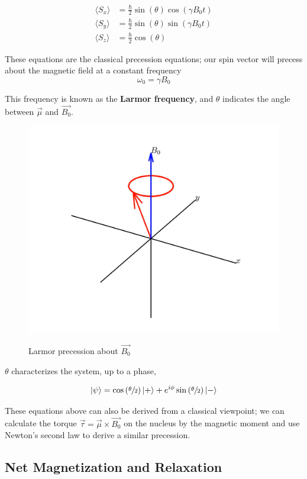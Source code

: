 \documentclass[
    floatfix,  %
    reprint,
    amsmath,amssymb,
    aps,
]{revtex4-2}
\DeclarePairedDelimiter\ket{\lvert}{\rangle}
\begin{document}
\begin{align*}
    \langle S_x \rangle &= \frac{\hbar}{2} \sin(\theta)\cos(\gamma B_0 t)\\
    \langle S_y \rangle &= \frac{\hbar}{2} \sin(\theta)\sin(\gamma B_0 t)\\
    \langle S_z \rangle &= \frac{\hbar}{2} \cos(\theta)
\end{align*}

These equations are the classical precession equations; our spin vector will precess about the magnetic field at a constant frequency
\begin{equation}
    \omega_0 = \gamma B_0
\end{equation}

This frequency is known as the \textbf{Larmor frequency}, and $\theta$ indicates the angle between $\vec{\mu}$ and $\vec{B_0}$. \cite{griffiths}

\begin{figure}[htbp]
    \centering
    {\includegraphics[width = 0.6\linewidth]{figs/larmor-precession.png}}
    \caption{Larmor precession about $\vec{B_0}$}
\end{figure}

$\theta$ characterizes the system, up to a phase,

\begin{gather*}
    \ket{\psi} = \cos\left(\sfrac{\theta}{2}\right)\ket{+}+ e^{i\phi}\sin\left(\sfrac{\theta}{2}\right) \ket{-}
\end{gather*}

These equations above can also be derived from a classical viewpoint; we can calculate the torque $\vec{\tau}  =\vec{ \mu }\times \vec{B_0}$ on the nucleus by the magnetic moment and use Newton's second law to derive a similar precession.




\subsection{\label{subsec:pulses} Net Magnetization and Relaxation}
\end{document}
